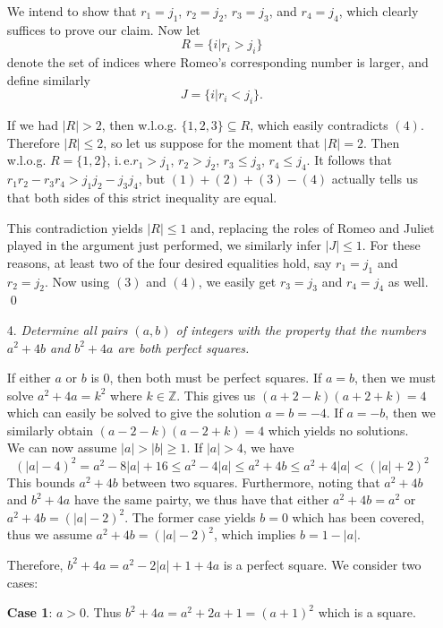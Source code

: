 \documentclass[a4paper, 12pt]{article}
\def\ie{i.\,e.}
\def\ie{i.\,e.}	%
\begin{document}
\begin{enumerate}
We intend to show that $r_1 = j_1$, $r_2 = j_2$, $r_3 = j_3$, and $r_4 = j_4$, which clearly suffices to prove our claim. Now let
\[
	R = \{ i | r_i > j_i \}
\]
denote the set of indices where Romeo's corresponding number is larger, and define similarly
\[
	J = \{ i | r_i < j_i \}.
\]

If we had $|R| > 2$, then w.l.o.g. $\{1, 2, 3\} \subseteq R$, which easily contradicts $(4)$. Therefore $|R| \leq 2$, so let us suppose for the moment that $|R| = 2$. Then w.l.o.g. $R = \{1, 2\}$, \ie $r_1 > j_1$, $r_2 > j_2$, $r_3 \leq j_3$, $r_4 \leq j_4$. It follows that $r_1 r_2 - r_3 r_4 > j_1 j_2 - j_3 j_4$, but $(1) + (2) + (3) - (4)$ actually tells us that both sides of this strict inequality are equal.

This contradiction yields $|R| \leq 1$ and, replacing the roles of Romeo and Juliet played in the argument just performed, we similarly infer $|J| \leq 1$. For these reasons, at least two of the four desired equalities hold, say $r_1 = j_1$ and $r_2 = j_2$. Now using $(3)$ and $(4)$, we easily get $r_3 = j_3$ and $r_4 = j_4$ as well.
\qed
\vspace{6mm}

\item[4.]  \textit{Determine all pairs $(a,b)$ of integers with the property that the numbers $a^2+4b$ and $b^2+4a$ are both perfect squares.}

 If either $a$ or $b$ is 0, then both must be perfect squares. If $a = b$, then we must solve $a^2 + 4a = k^2$ where $k \in \mathbb{Z}$. This gives us $(a+2-k)(a+2+k) = 4$ which can easily be solved to give the solution $a = b = -4$. If $a = -b$, then we similarly obtain $(a-2-k)(a-2+k) = 4$ which yields no solutions. \\

We can now assume $|a| > |b| \geq 1$.  If $|a| > 4$, we have
\begin{equation*}
    (|a| - 4)^2 = a^2 - 8|a| + 16 \leq a^2 - 4|a| \leq a^2 + 4b \leq a^2 + 4|a| < (|a| + 2)^2
\end{equation*}
This bounds $a^2 + 4b$ between two squares. Furthermore, noting that $a^2 + 4b$ and $b^2 + 4a$ have the same pairty, we thus have that either $a^2 + 4b = a^2$ or $a^2 + 4b = (|a| - 2)^2$. The former case yields $b = 0$ which has been covered, thus we assume $a^2 + 4b = (|a| - 2)^2$, which implies $b = 1 - |a|$.

Therefore, $b^2 + 4a = a^2 - 2|a| + 1 + 4a$ is a perfect square. We consider two cases:

\textbf{Case 1}: $a > 0$. Thus $b^2 + 4a = a^2 + 2a + 1 = (a+1)^2$ which is a square.


\end{enumerate}
\end{document}
